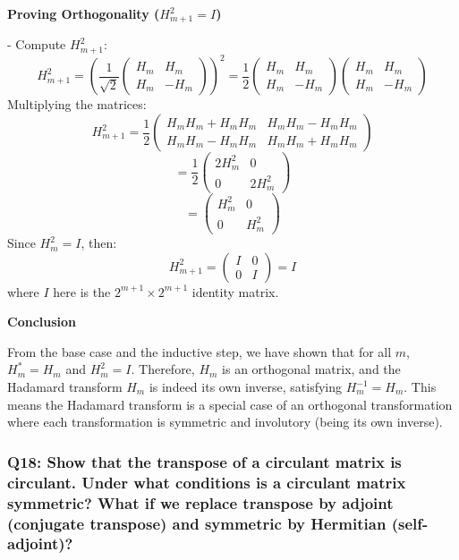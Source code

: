 \documentclass[8pt]{article}
\begin{document}
\textbf{Proving Orthogonality (\(H_{m+1}^2 = I\))}

- Compute \(H_{m+1}^2\):
  \[
  H_{m+1}^2 = \left(\frac{1}{\sqrt{2}} \begin{pmatrix} H_m & H_m \\ H_m & -H_m \end{pmatrix}\right)^2 = \frac{1}{2} \begin{pmatrix} H_m & H_m \\ H_m & -H_m \end{pmatrix} \begin{pmatrix} H_m & H_m \\ H_m & -H_m \end{pmatrix}
  \]
  Multiplying the matrices:
  \[
  H_{m+1}^2 = \frac{1}{2} \begin{pmatrix} H_m H_m + H_m H_m & H_m H_m - H_m H_m \\ H_m H_m - H_m H_m & H_m H_m + H_m H_m \end{pmatrix}
  \]
  \[
  = \frac{1}{2} \begin{pmatrix} 2H_m^2 & 0 \\ 0 & 2H_m^2 \end{pmatrix}
  \]
  \[
  = \begin{pmatrix} H_m^2 & 0 \\ 0 & H_m^2 \end{pmatrix}
  \]
  Since \(H_m^2 = I\), then:
  \[
  H_{m+1}^2 = \begin{pmatrix} I & 0 \\ 0 & I \end{pmatrix} = I
  \]
  where \(I\) here is the \(2^{m+1} \times 2^{m+1}\) identity matrix.

\textbf{Conclusion}

From the base case and the inductive step, we have shown that for all \(m\), \(H_m^* = H_m\) and \(H_m^2 = I\). Therefore, \(H_m\) is an orthogonal matrix, and the Hadamard transform \(H_m\) is indeed its own inverse, satisfying \(H_m^{-1} = H_m\). This means the Hadamard transform is a special case of an orthogonal transformation where each transformation is symmetric and involutory (being its own inverse).

\subsubsection*{Q18:
Show that the transpose of a circulant matrix is circulant. Under what conditions is a circulant matrix symmetric? What if we replace transpose by adjoint (conjugate transpose) and symmetric by Hermitian (self-adjoint)?}
\end{document}
